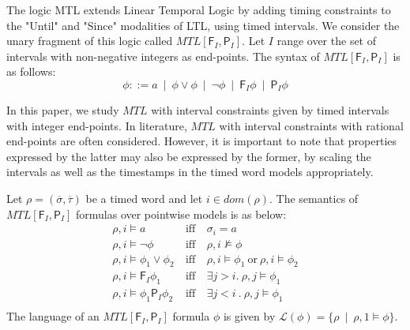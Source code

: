 \documentclass{llncs}
\newcommand{\fif}{\rmiff}
\newcommand{\rmiff}{\mathbin{~\mbox{iff}~}}
\newcommand{\fut}{\textsf{F}}
\newcommand{\past}{\textsf{P}}
\newcommand{\mtlfp}{\mbox{$\mathit{MTL[\fut_I,\past_I]}$}}
\newcommand{\mtl}{\mbox{$\mathit{MTL}$}}
\begin{document}
The logic MTL \cite{Koy90,AH91} extends Linear Temporal Logic by adding timing
constraints to the "Until" and "Since" modalities of LTL, using timed intervals. We consider the unary fragment of this logic called \mtlfp. Let $I$ range over the set of intervals with non-negative integers as end-points. The syntax of \mtlfp\/ is as follows:
\[
\phi ::= a ~\mid~ \phi \lor\phi ~\mid~ \neg \phi ~\mid~ \fut_I\phi ~\mid~ \past_I\phi
\]

\begin{remark}
In this paper, we study \mtl\/ with interval constraints given by timed intervals with integer end-points. In literature, \mtl\/ with interval constraints with rational end-points are often considered. However, it is important to note that properties expressed by the latter may also be expressed by the former, by scaling the intervals as well as the timestamps in the timed word models appropriately.
\end{remark}

Let $\rho=(\overline{\sigma},\overline{\tau})$ be a timed word and let
$i\in dom(\rho)$. The semantics of \mtlfp\/ formulas over pointwise models is as below:
\[
\begin{array}{rcl}
\rho,i\models a & \fif & \sigma_i=a\\
\rho,i\models \neg \phi & \fif & \rho,i\not\models \phi\\
\rho,i\models \phi_1\lor \phi_2 & \fif & \rho,i\models\phi_1 ~\mbox{or} ~\rho,i\models\phi_2\\
\rho,i\models \fut_I \phi_1 & \fif & \exists j>i .~ \rho,j\models\phi_1\\
\rho,i\models \phi_1 \past_I \phi_2 & \fif & \exists j<i ~.~ \rho,j\models\phi_1\\
\end{array}
\]
The language of an \mtlfp\/ formula $\phi$ is given by $\mathcal L(\phi) = 
\{\rho ~\mid~ \rho, 1 \models \phi\}$.\\
\end{document}
